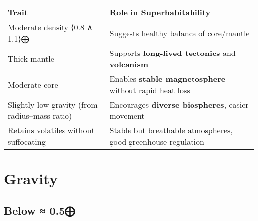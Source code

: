 \documentclass[
  letterpaper,
]{book}
\begin{document}
\begin{longtable}[]{@{}
  >{\raggedright\arraybackslash}p{}
  >{\raggedright\arraybackslash}p{}@{}}
\toprule\noalign{}
\begin{minipage}[b]{\linewidth}\raggedright
Trait
\end{minipage} & \begin{minipage}[b]{\linewidth}\raggedright
Role in Superhabitability
\end{minipage} \\
\midrule\noalign{}
\endhead
\bottomrule\noalign{}
\endlastfoot
Moderate density ⟨0.8 ∧ 1.1⟩⨁ & Suggests healthy balance of
core/mantle \\
Thick mantle & Supports \textbf{long-lived tectonics} and
\textbf{volcanism} \\
Moderate core & Enables \textbf{stable magnetosphere} without rapid heat
loss \\
Slightly low gravity (from radius--mass ratio) & Encourages
\textbf{diverse biospheres}, easier movement \\
Retains volatiles without suffocating & Stable but breathable
atmospheres, good greenhouse regulation \\
\end{longtable}

\chapter{Gravity}\label{gravity}

\section{Below ≈ 0.5⨁}\label{below-0.5}
\end{document}
